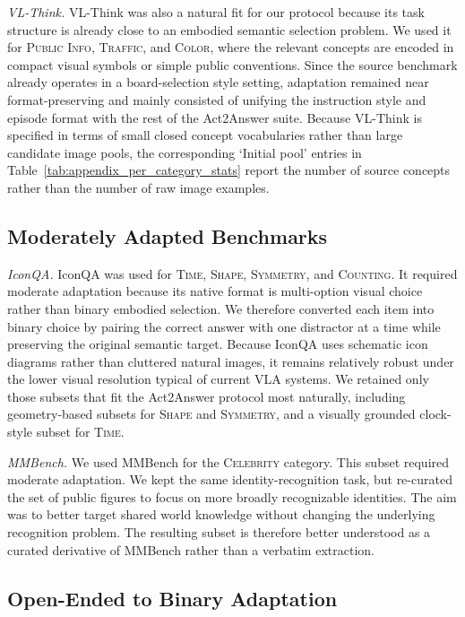 \documentclass[11pt]{article}
\begin{document}
\noindent\textit{VL-Think.}
VL-Think was also a natural fit for our protocol because its task structure is already close to an embodied semantic selection problem. We used it for \textsc{Public Info}, \textsc{Traffic}, and \textsc{Color}, where the relevant concepts are encoded in compact visual symbols or simple public conventions. Since the source benchmark already operates in a board-selection style setting, adaptation remained near format-preserving and mainly consisted of unifying the instruction style and episode format with the rest of the Act2Answer suite. Because VL-Think is specified in terms of small closed concept vocabularies rather than large candidate image pools, the corresponding `Initial pool' entries in Table~\ref{tab:appendix_per_category_stats} report the number of source concepts rather than the number of raw image examples.

\subsection{Moderately Adapted Benchmarks}

\noindent\textit{IconQA.}
IconQA was used for \textsc{Time}, \textsc{Shape}, \textsc{Symmetry}, and \textsc{Counting}. It required moderate adaptation because its native format is multi-option visual choice rather than binary embodied selection. We therefore converted each item into binary choice by pairing the correct answer with one distractor at a time while preserving the original semantic target. Because IconQA uses schematic icon diagrams rather than cluttered natural images, it remains relatively robust under the lower visual resolution typical of current VLA systems. We retained only those subsets that fit the Act2Answer protocol most naturally, including geometry-based subsets for \textsc{Shape} and \textsc{Symmetry}, and a visually grounded clock-style subset for \textsc{Time}.

\noindent\textit{MMBench.}
We used MMBench for the \textsc{Celebrity} category. This subset required moderate adaptation. We kept the same identity-recognition task, but re-curated the set of public figures to focus on more broadly recognizable identities. The aim was to better target shared world knowledge without changing the underlying recognition problem. The resulting subset is therefore better understood as a curated derivative of MMBench rather than a verbatim extraction.


\subsection{Open-Ended to Binary Adaptation}
\end{document}

